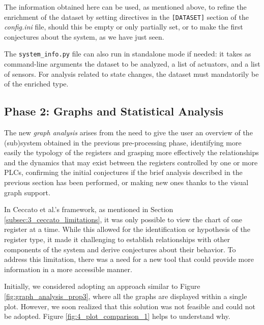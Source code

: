 The information obtained here can be used, as mentioned above, to refine the enrichment of the dataset by setting directives in the \texttt{[DATASET]} section of the \textit{config.ini} file, should this be empty or only partially set, or to make the first conjectures about the system, as we have just seen.

\bigskip
The \texttt{system\_info.py} file can also run in standalone mode if needed: it takes as command-line arguments the dataset to be analyzed, a list of actuators, and a list of sensors. For analysis related to state changes, the dataset must mandatorily be of the enriched type.

\subsection{Phase 2: Graphs and Statistical Analysis}
\label{subsec:4_improve_graphs}

The new \textit{graph analysis} arises from the need to give the user an overview of the (sub)system obtained in the previous pre-processing phase, identifying more easily the typology of the registers and grasping more effectively the relationships and the dynamics that may exist between the registers controlled by one or more PLCs, confirming the initial conjectures if the brief analysis described in the previous section has been performed, or making new ones thanks to the visual graph support. 

\bigskip
In Ceccato et al.'s framework, as mentioned in Section \ref{subsec:3_ceccato_limitations}, it was only possible to view the chart of one register at a time. While this allowed for the identification or hypothesis of the register type, it made it challenging to establish relationships with other components of the system and derive conjectures about their behavior. To address this limitation, there was a need for a new tool that could provide more information in a more accessible manner.

\bigskip
Initially, we considered adopting an approach similar to Figure \ref{fig:graph_analysis_prop3}, where all the graphs are displayed within a single plot. However, we soon realized that this solution was not feasible and could not be adopted. Figure \ref{fig:4_plot_comparison_1} helps to understand why.  

